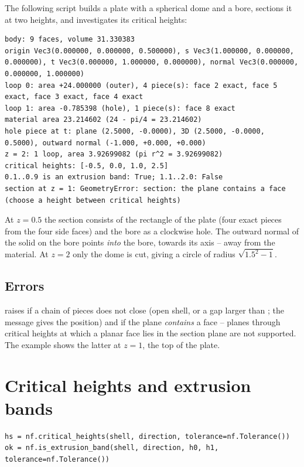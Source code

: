 The following script builds a plate with a spherical dome and a bore, sections it at two
heights, and investigates its critical heights:


\begin{lstlisting}[style=text]
body: 9 faces, volume 31.330383
origin Vec3(0.000000, 0.000000, 0.500000), s Vec3(1.000000, 0.000000, 0.000000), t Vec3(0.000000, 1.000000, 0.000000), normal Vec3(0.000000, 0.000000, 1.000000)
loop 0: area +24.000000 (outer), 4 piece(s): face 2 exact, face 5 exact, face 3 exact, face 4 exact
loop 1: area -0.785398 (hole), 1 piece(s): face 8 exact
material area 23.214602 (24 - pi/4 = 23.214602)
hole piece at t: plane (2.5000, -0.0000), 3D (2.5000, -0.0000, 0.5000), outward normal (-1.000, +0.000, +0.000)
z = 2: 1 loop, area 3.92699082 (pi r^2 = 3.92699082)
critical heights: [-0.5, 0.0, 1.0, 2.5]
0.1..0.9 is an extrusion band: True; 1.1..2.0: False
section at z = 1: GeometryError: section: the plane contains a face (choose a height between critical heights)
\end{lstlisting}

At $z=0.5$ the section consists of the rectangle of the plate (four exact pieces from the four
side faces) and the bore as a clockwise hole. The outward normal of the solid on the bore
points \emph{into} the bore, towards its axis -- away from the material. At $z=2$ only the
dome is cut, giving a circle of radius $\sqrt{1.5^2-1}$.

\subsection{Errors}

 raises  if a chain of pieces does not close (open shell, or
a gap larger than ; the message gives the position) and if the plane
\emph{contains} a face -- planes through critical heights at which a planar face lies in the
section plane are not supported. The example shows the latter at $z=1$, the top of the plate.

\section{Critical heights and extrusion bands}\label{sec:critical-heights}

\begin{lstlisting}
hs = nf.critical_heights(shell, direction, tolerance=nf.Tolerance())
ok = nf.is_extrusion_band(shell, direction, h0, h1, tolerance=nf.Tolerance())
\end{lstlisting}

